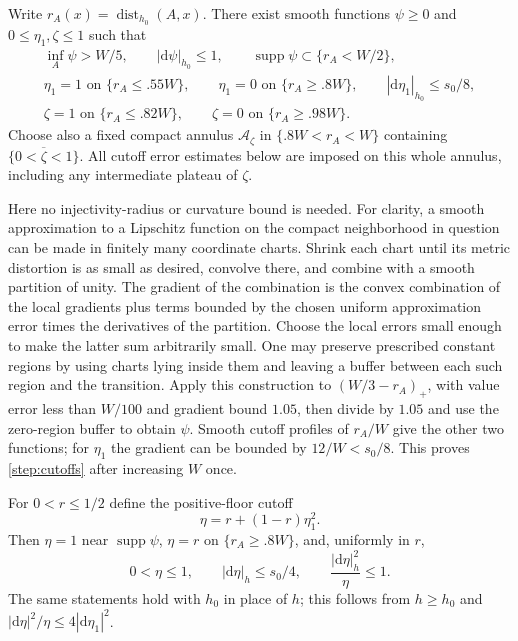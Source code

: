 \documentclass[11pt]{article}
\numberwithin{equation}{section}
\theoremstyle{definition}
\theoremstyle{remark}
\begin{document}
Write $r_A(x)=\operatorname{dist}_{h_0}(A,x)$.  There exist smooth functions
$\psi\ge0$ and $0\le\eta_1,\zeta\le1$ such that
\begin{equation}\label{step:cutoffs}
\begin{gathered}
 \inf_A\psi>W/5,\qquad |\mathrm d\psi|_{h_0}\le1,
 \qquad\operatorname{supp}\psi\subset\{r_A<W/2\},\\
 \eta_1=1\text{ on }\{r_A\le .55W\},\qquad
 \eta_1=0\text{ on }\{r_A\ge .8W\},\qquad
 |\mathrm d\eta_1|_{h_0}\le s_0/8,\\
 \zeta=1\text{ on }\{r_A\le .82W\},\qquad
 \zeta=0\text{ on }\{r_A\ge .98W\}.
\end{gathered}
\end{equation}
Choose also a fixed compact annulus $\mathcal A_\zeta$ in
$\{.8W<r_A<W\}$ containing $\overline{\{0<\zeta<1\}}$.
All cutoff error estimates below are imposed on this whole annulus,
including any intermediate plateau of $\zeta$.

Here no injectivity-radius or curvature bound is needed.  For clarity, a
smooth approximation to a Lipschitz function on the compact neighborhood
in question can be made in finitely many coordinate charts.  Shrink each
chart until its metric distortion is as small as desired, convolve there,
and combine with a smooth partition of unity.  The gradient of the
combination is the convex combination of the local gradients plus terms
bounded by the chosen uniform approximation error times the derivatives
of the partition.  Choose the local errors small enough to make the latter
sum arbitrarily small.  One may preserve prescribed constant regions by
using charts lying inside them and leaving a buffer between each such
region and the transition.  Apply this construction to
$(W/3-r_A)_+$, with value error less than $W/100$ and gradient bound
$1.05$, then divide by $1.05$ and use the zero-region buffer to obtain
$\psi$.  Smooth cutoff profiles of $r_A/W$ give the other two functions;
for $\eta_1$ the gradient can be bounded by $12/W<s_0/8$.  This proves
\cref{step:cutoffs} after increasing $W$ once.

For $0<r\le1/2$ define the positive-floor cutoff
\begin{equation}\label{step:floor}
 \eta=r+(1-r)\eta_1^2.
\end{equation}
Then $\eta=1$ near $\operatorname{supp}\psi$, $\eta=r$ on $\{r_A\ge.8W\}$,
and, uniformly in $r$,
\begin{equation}\label{step:floor-bounds}
 0<\eta\le1,\qquad |\mathrm d\eta|_h\le s_0/4,
 \qquad \frac{|\mathrm d\eta|_h^2}{\eta}\le1.
\end{equation}
The same statements hold with $h_0$ in place of $h$; this follows from
$h\ge h_0$ and $|\mathrm d\eta|^2/\eta\le4|\mathrm d\eta_1|^2$.
\end{document}
